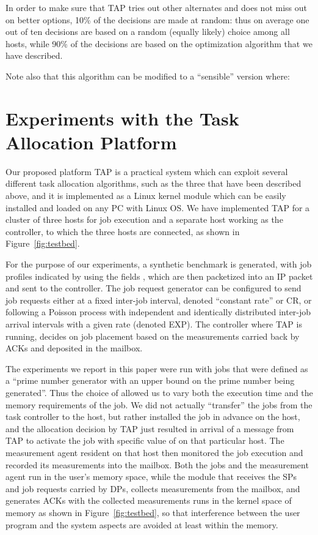 \documentclass[journal]{IEEEtran}
\begin{document}
In order to make sure that TAP tries out other alternates and does not miss out on better options, 10\% of the decisions are made at random: thus on average
one out of ten decisions are based on a random (equally likely) choice among all hosts, while 90\% of the decisions are based on the optimization algorithm that we have described.

Note also that this algorithm can be modified to a ``sensible'' version where:






\section{Experiments with the Task Allocation Platform}
\label{experimentalresults}

Our proposed platform TAP is a practical system which can exploit several different task allocation algorithms, such as the three that have been described above, and
it is implemented as a Linux kernel module which can be easily installed and loaded on any PC with Linux OS.
We have implemented TAP for a cluster of three hosts for job execution and a separate host working as the controller, to which the three hosts are connected, as shown in Figure~\ref{fig:testbed}. 

For the purpose of our experiments, a synthetic benchmark is generated, with job profiles indicated  by using the  fields , which are then packetized into an IP packet and sent to the controller. The job request generator can be configured to send job requests either at a fixed inter-job interval, denoted ``constant rate'' or CR, or following a Poisson process with independent and identically distributed
inter-job arrival intervals with a given rate (denoted EXP).  The controller where TAP is running, decides on job placement based on the measurements carried back by ACKs and deposited in the mailbox. 

The experiments we report in this paper were run with jobs that were defined as a ``prime number generator with an upper bound  on the prime number being generated''. Thus the choice of  allowed us to vary both
the execution time and the memory requirements of the job. We did not actually ``transfer'' the jobs from the task controller to the host, but rather installed the job in advance on the host,
and the allocation decision by TAP just resulted in arrival of a message from TAP to activate the job with specific value of  on that particular host. 
The measurement agent resident on that host then monitored the job execution and recorded its measurements into the mailbox. Both the jobs and the measurement agent run in the user's memory space,
while  the module that receives the SPs and job requests carried by DPs, collects measurements from the mailbox, and generates ACKs with the collected measurements runs in the kernel space of memory as shown in Figure~\ref{fig:testbed}, so that interference between the user program and the system aspects are avoided at least within the memory. 
\end{document}
